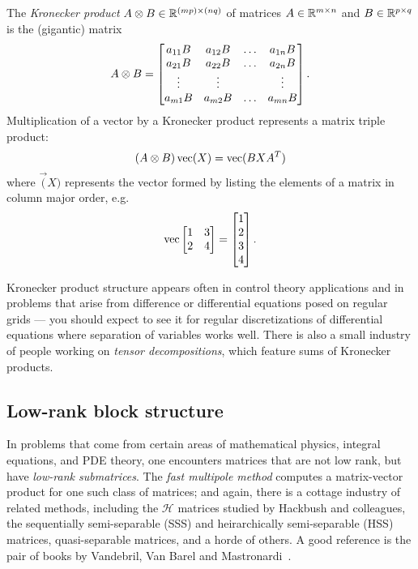 The {\em Kronecker product} $A \kron B \in \bbR^{(mp) \times (nq)}$
of matrices $A \in \bbR^{m \times n}$ and $B \in \bbR^{p \times q}$
is the (gigantic) matrix
\[
  A \kron B =
  \begin{bmatrix}
    a_{11} B & a_{12} B & \ldots & a_{1n} B \\
    a_{21} B & a_{22} B & \ldots & a_{2n} B \\
    \vdots & \vdots & & \vdots \\
    a_{m1} B & a_{m2} B & \ldots & a_{mn} B
  \end{bmatrix}.
\]
Multiplication of a vector by a Kronecker product represents
a matrix triple product:
\[
  (A \kron B) \vec(X) = \vec(BXA^T)
\]
where $\vec(X)$ represents the vector formed by listing the
elements of a matrix in column major order, e.g.
\[
  \vec \begin{bmatrix} 1 & 3 \\ 2 & 4 \end{bmatrix} =
  \begin{bmatrix} 1 \\ 2 \\ 3 \\ 4 \end{bmatrix}.
\]

Kronecker product structure appears often in control theory
applications and in problems that arise from difference or
differential equations posed on regular grids --- you should
expect to see it for regular discretizations of differential
equations where separation of variables works well.  There is
also a small industry of people working on {\em tensor decompositions},
which feature sums of Kronecker products.

\subsection{Low-rank block structure}

In problems that come from certain areas of mathematical physics,
integral equations, and PDE theory, one encounters matrices that are not
low rank, but have  {\em low-rank submatrices}.  The {\em fast multipole
method} computes a matrix-vector product for one such class of matrices;
and again, there is a cottage industry of related methods, including
the $\mathcal{H}$ matrices studied by Hackbush and colleagues, the
sequentially semi-separable (SSS) and heirarchically
semi-separable (HSS) matrices, quasi-separable matrices, and a horde of
others.  A good reference is the pair of books by Vandebril, Van Barel
and Mastronardi~\cite{Vandebril:2010:Linear,Vandebril:2010:Eigen}.
